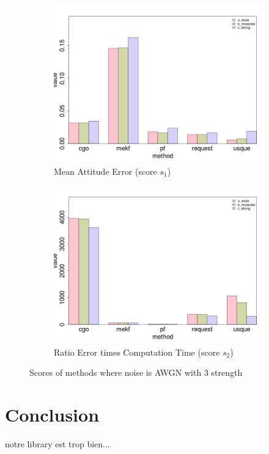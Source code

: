 \documentclass[twocolumn]{bmcart}
\begin{document}
\begin{figure}[!h]

\begin{subfigure}{.5\textwidth}
  \centering
  \includegraphics[width=.85\linewidth]{images/histo_s1_add.png}
  \caption{Mean Attitude Error (score $s_1$)}
\end{subfigure}%
\begin{subfigure}{.5\textwidth}
  \centering
  \includegraphics[width=.85\linewidth]{images/histo_s2_add.png}
  \caption{Ratio Error times Computation Time (score $s_2$)}

\end{subfigure}
\caption{Scores of methods where noise is AWGN with 3 strength}

\end{figure}


\section{Conclusion}

notre library est trop bien...


\end{document}
